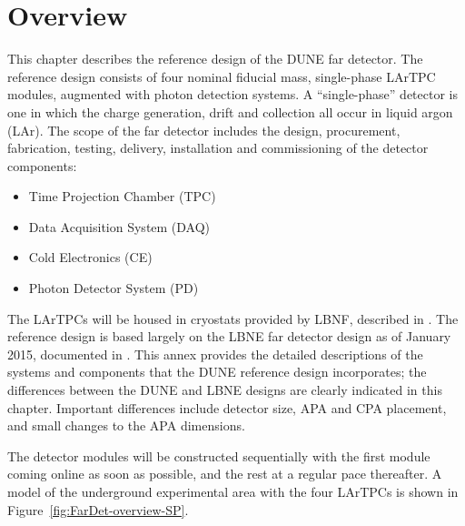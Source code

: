 \section{Overview}
\label{sec:detectors-fd-ref-ov}


This chapter describes the reference design of the DUNE far detector.
The reference design consists of four nominal  fiducial mass,
single-phase %
LArTPC modules, augmented
with photon detection systems.  A ``single-phase'' detector is one in
which the charge generation, drift and collection all occur in liquid
argon (LAr). The scope of the far detector includes the design,
procurement, fabrication, testing, delivery, installation and
commissioning of the detector components:
\begin{itemize}
\item Time Projection Chamber (TPC)
\item Data Acquisition System (DAQ)  
\item Cold Electronics (CE)
\item Photon Detector System (PD)
\end{itemize}
The LArTPCs will be housed in cryostats provided by LBNF, described in
\vollbnf. The reference design is based largely on the LBNE far
detector design as of January 2015, documented in \anxlbnefd. This
annex provides the detailed descriptions of the systems and components
that the DUNE reference design incorporates; the differences between
the DUNE and LBNE designs are clearly indicated in this
chapter. Important differences include detector size, APA and CPA
placement, and small changes to the APA dimensions.

The detector modules will be constructed sequentially
with the first module coming online as soon as possible, and the rest
at a regular pace thereafter. A model of the underground experimental area with
the four  LArTPCs is shown in
Figure~\ref{fig:FarDet-overview-SP}. 

